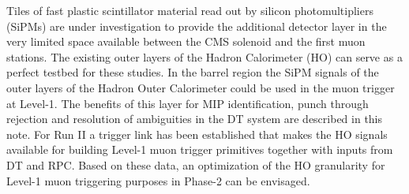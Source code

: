 Tiles of fast plastic scintillator material read out by silicon photomultipliers (SiPMs) are under investigation to provide the additional detector layer in the very limited space available 
between the CMS solenoid and the first muon stations. The existing outer layers of the Hadron Calorimeter (HO)  can serve as a perfect testbed for these studies. In the barrel region the 
SiPM signals of the outer layers of the Hadron Outer Calorimeter could be used in the muon trigger at Level-1. The benefits of this layer for MIP identification, punch through rejection 
and resolution of ambiguities in the DT system are described in this note. For Run II a trigger link has been established that makes the HO signals available for building Level-1 muon 
trigger primitives together with inputs from DT and RPC. Based on these data, an optimization of the HO granularity for Level-1 muon triggering purposes in Phase-2 can be envisaged. 

